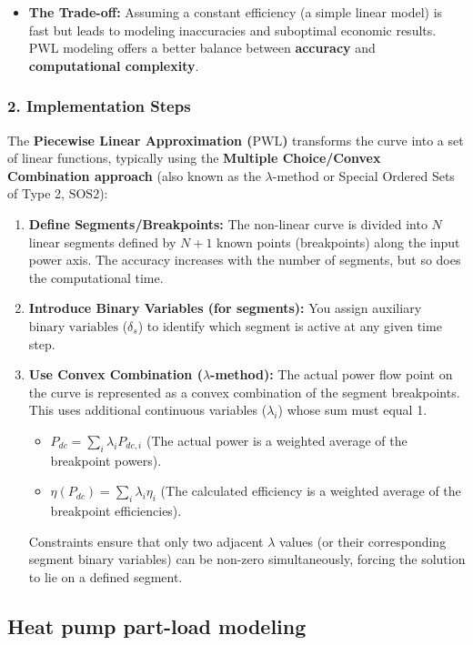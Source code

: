\documentclass[11pt,a4paper]{report}
\begin{document}
\begin{itemize}
 \item \textbf{The Trade-off:} Assuming a constant efficiency (a simple linear model) is fast but leads to modeling inaccuracies and suboptimal economic results. $\text{PWL}$ modeling offers a better balance between \textbf{accuracy} and \textbf{computational complexity}.\end{itemize}\subsubsection*{2. Implementation Steps}The \textbf{Piecewise Linear Approximation ($\text{PWL}$)} transforms the curve into a set of linear functions, typically using the \textbf{Multiple Choice/Convex Combination approach} (also known as the $\lambda$-method or Special Ordered Sets of Type 2, $\text{SOS}2$):\begin{enumerate}\item \textbf{Define Segments/Breakpoints:} The non-linear curve is divided into $N$ linear segments defined by $N+1$ known points (breakpoints) along the input power axis. The accuracy increases with the number of segments, but so does the computational time.\item \textbf{Introduce Binary Variables (for segments):} You assign auxiliary $\text{binary variables}$ ($\delta_s$) to identify which segment is active at any given time step.\item \textbf{Use Convex Combination ($\lambda$-method):} The actual power flow point on the curve is represented as a convex combination of the segment breakpoints. This uses additional continuous variables ($\lambda_i$) whose sum must equal 1.
 \begin{itemize}
 \item $P_{dc} = \sum_{i} \lambda_i P_{dc, i}$ (The actual power is a weighted average of the breakpoint powers).
 \item $\eta(P_{dc}) = \sum_{i} \lambda_i \eta_i$ (The calculated efficiency is a weighted average of the breakpoint efficiencies).
 \end{itemize}
 Constraints ensure that only two adjacent $\lambda$ values (or their corresponding segment binary variables) can be non-zero simultaneously, forcing the solution to lie on a defined segment.
 \end{enumerate}

\subsection{Heat pump part-load modeling}
\label{sub:part_load_modeling}
\end{document}
